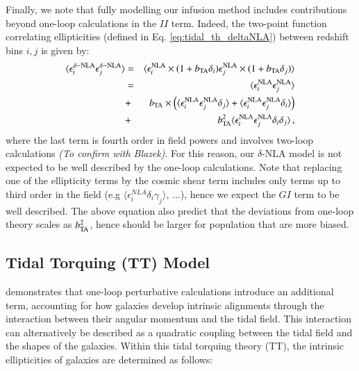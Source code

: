 Finally, we note that fully modelling our infusion method includes contributions beyond one-loop calculations in the $II$ term. Indeed, the two-point function correlating ellipticities (defined in Eq. \ref{eq:tidal_th_deltaNLA}) between redshift bins $i,j$ is given by:
 \begin{eqnarray}
\langle \epsilon_{i}^{\delta-\rm NLA} \epsilon_{j}^{\delta-\rm NLA}\rangle &=& \langle \epsilon_{i}^{\rm NLA}\times(1 + b_{\rm TA}\delta_i) \epsilon_{j}^{\rm NLA}\times(1 + b_{\rm TA}\delta_j)\rangle\\
&=& \langle \epsilon_{i}^{\rm NLA}  \epsilon_{j}^{\rm NLA}\rangle \nonumber \\
&+& b_{\rm TA} \times \left(\langle \epsilon_{i}^{\rm NLA}  \epsilon_{j}^{\rm NLA}\delta_j  \rangle + \langle \epsilon_{i}^{\rm NLA}  \epsilon_{j}^{\rm NLA}\delta_i  \rangle \right)\nonumber\\
&+& b_{\rm TA}^2 \langle \epsilon_{i}^{\rm NLA}  \epsilon_{j}^{\rm NLA}\delta_i  \delta_j \rangle \, ,
\label{eq:2pcf_deltaNLA}
\end{eqnarray}
where the last term is fourth order in field powers and involves two-loop calculations {\it (To confirm with Blazek)}. For this reason, our $\delta$-NLA model is not expected to be well described by the one-loop calculations. Note that replacing one of the ellipticity terms by the cosmic shear term includes only terms up to third order in the field (e.g $\langle \epsilon_{i}^{NLA}\delta_i \gamma_j \rangle$, ...), hence  we expect the $GI$ term to be well described. The above equation also predict that the deviations from one-loop theory scales as $b_{\rm TA}^2$, hence should be larger for population that are more biased.


\subsection{Tidal Torquing (TT) Model}
\label{subsec:IA_th_TT}

\citet{TATT} demonstrates that one-loop perturbative calculations introduce an additional term, accounting for how galaxies develop intrinsic alignments through the interaction between their angular momentum and the tidal field.
This interaction can alternatively be described as a quadratic coupling between the tidal field and the shapes of the galaxies. 
Within this tidal torquing theory (TT), the intrinsic ellipticities of galaxies are determined as follows:

